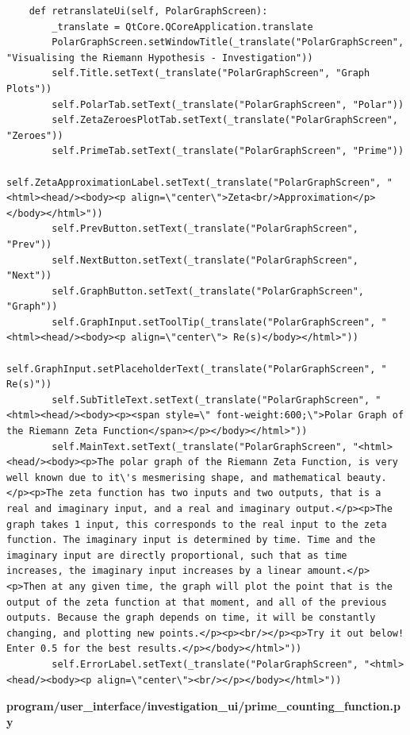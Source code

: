 \documentclass{article}
\begin{document}
\begin{lstlisting}
    def retranslateUi(self, PolarGraphScreen):
        _translate = QtCore.QCoreApplication.translate
        PolarGraphScreen.setWindowTitle(_translate("PolarGraphScreen", "Visualising the Riemann Hypothesis - Investigation"))
        self.Title.setText(_translate("PolarGraphScreen", "Graph Plots"))
        self.PolarTab.setText(_translate("PolarGraphScreen", "Polar"))
        self.ZetaZeroesPlotTab.setText(_translate("PolarGraphScreen", "Zeroes"))
        self.PrimeTab.setText(_translate("PolarGraphScreen", "Prime"))
        self.ZetaApproximationLabel.setText(_translate("PolarGraphScreen", "<html><head/><body><p align=\"center\">Zeta<br/>Approximation</p></body></html>"))
        self.PrevButton.setText(_translate("PolarGraphScreen", "Prev"))
        self.NextButton.setText(_translate("PolarGraphScreen", "Next"))
        self.GraphButton.setText(_translate("PolarGraphScreen", "Graph"))
        self.GraphInput.setToolTip(_translate("PolarGraphScreen", "<html><head/><body><p align=\"center\"> Re(s)</body></html>"))
        self.GraphInput.setPlaceholderText(_translate("PolarGraphScreen", "          Re(s)"))
        self.SubTitleText.setText(_translate("PolarGraphScreen", "<html><head/><body><p><span style=\" font-weight:600;\">Polar Graph of the Riemann Zeta Function</span></p></body></html>"))
        self.MainText.setText(_translate("PolarGraphScreen", "<html><head/><body><p>The polar graph of the Riemann Zeta Function, is very well known due to it\'s mesmerising shape, and mathematical beauty.</p><p>The zeta function has two inputs and two outputs, that is a real and imaginary input, and a real and imaginary output.</p><p>The graph takes 1 input, this corresponds to the real input to the zeta function. The imaginary input is determined by time. Time and the imaginary input are directly proportional, such that as time increases, the imaginary input increases by a linear amount.</p><p>Then at any given time, the graph will plot the point that is the output of the zeta function at that moment, and all of the previous outputs. Because the graph depends on time, it will be constantly changing, and plotting new points.</p><p><br/></p><p>Try it out below! Enter 0.5 for the best results.</p></body></html>"))
        self.ErrorLabel.setText(_translate("PolarGraphScreen", "<html><head/><body><p align=\"center\"><br/></p></body></html>"))
\end{lstlisting}


\textbf{program/user\_interface/investigation\_ui/prime\_counting\_function.py}
\end{document}
